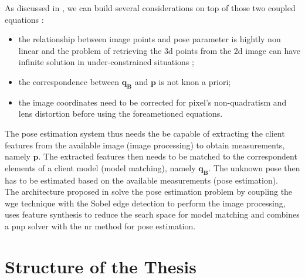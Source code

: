 As discussed in \cite{D2014}, we can build several considerations on top of those two coupled equations : 
\begin{itemize}
 \item the relationship between image points and pose parameter is hightly non linear and the problem of retrieving the \acrshort{3d} points from the \acrshort{2d} image can have infinite solution in under-constrained situations \cite{10.1145/358669.358692};
 \item the correspondence between $\mathbf{q_B}$ and $\mathbf{p}$ is not knon a priori;
 \item the image coordinates need to be corrected for pixel's non-quadratism and lens distortion before using the foreametioned equations.
\end{itemize}
The pose estimation system thus needs the be capable of extracting the client features from the available image (image processing) to obtain measurements, namely  $\mathbf{p}$. The extracted features then needs to be matched to the correspondent elements of a client model (model matching), namely $\mathbf{q_B}$. The unknown pose then has to be estimated based on the available measurements (pose estimation).\\
The architecture proposed in \cite{Sharma2018} solve the pose estimation problem by coupling the \acrfull{wge} technique with the Sobel edge detection to perform the image processing, uses feature synthesis to reduce the searh space for model matching and combines a \acrshort{pnp} solver with the \acrfull{nr} method for pose estimation.

\section{Structure of the Thesis}

\newpage

